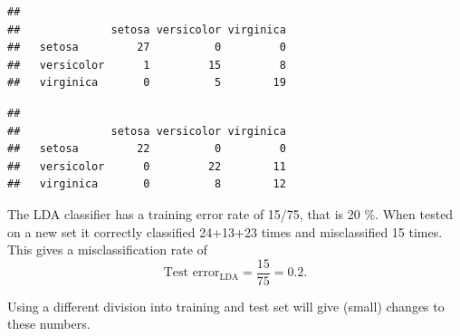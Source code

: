 \documentclass[10pt,ignorenonframetext,]{beamer}
\newenvironment{Shaded}{\begin{snugshade}}{\end{snugshade}}
\newcommand{\KeywordTok}[1]{\textcolor[rgb]{0.13,0.29,0.53}{\textbf{#1}}}
\newcommand{\DataTypeTok}[1]{\textcolor[rgb]{0.13,0.29,0.53}{#1}}
\newcommand{\StringTok}[1]{\textcolor[rgb]{0.31,0.60,0.02}{#1}}
\newcommand{\CommentTok}[1]{\textcolor[rgb]{0.56,0.35,0.01}{\textit{#1}}}
\newcommand{\OperatorTok}[1]{\textcolor[rgb]{0.81,0.36,0.00}{\textbf{#1}}}
\newcommand{\NormalTok}[1]{#1}
\begin{document}
\begin{frame}[fragile]

\begin{Shaded}
\end{Shaded}

\begin{verbatim}
##             
##              setosa versicolor virginica
##   setosa         27          0         0
##   versicolor      1         15         8
##   virginica       0          5        19
\end{verbatim}

\begin{Shaded}
\end{Shaded}

\begin{verbatim}
##             
##              setosa versicolor virginica
##   setosa         22          0         0
##   versicolor      0         22        11
##   virginica       0          8        12
\end{verbatim}

\end{frame}

\begin{frame}

The LDA classifier has a training error rate of 15/75, that is 20 \%.
When tested on a new set it correctly classified 24+13+23 times and
misclassified 15 times. This gives a misclassification rate of
\[\text{Test error}_\text{LDA}  = \frac{15}{75} =0.2.\]

Using a different division into training and test set will give (small)
changes to these numbers.

\end{frame}
\end{document}
